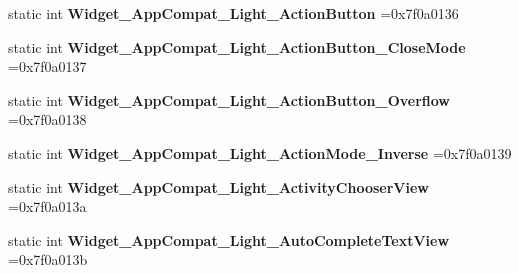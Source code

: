 \begin{DoxyCompactItemize}
\mbox{\label{classandroid_1_1support_1_1graphics_1_1drawable_1_1animated_1_1R_1_1style_a8b557196bb4a954696ad974012ed06b7}} 
static int {\bfseries Widget\+\_\+\+App\+Compat\+\_\+\+Light\+\_\+\+Action\+Button} =0x7f0a0136
\item 
\mbox{\label{classandroid_1_1support_1_1graphics_1_1drawable_1_1animated_1_1R_1_1style_a15cfbbe2348e811a4c38a0bebd78b4c4}} 
static int {\bfseries Widget\+\_\+\+App\+Compat\+\_\+\+Light\+\_\+\+Action\+Button\+\_\+\+Close\+Mode} =0x7f0a0137
\item 
\mbox{\label{classandroid_1_1support_1_1graphics_1_1drawable_1_1animated_1_1R_1_1style_a9a9e6d5be5f38e6988c7c5eeb030dee9}} 
static int {\bfseries Widget\+\_\+\+App\+Compat\+\_\+\+Light\+\_\+\+Action\+Button\+\_\+\+Overflow} =0x7f0a0138
\item 
\mbox{\label{classandroid_1_1support_1_1graphics_1_1drawable_1_1animated_1_1R_1_1style_adfcdf5890798fdfa145b191c2c83d2bc}} 
static int {\bfseries Widget\+\_\+\+App\+Compat\+\_\+\+Light\+\_\+\+Action\+Mode\+\_\+\+Inverse} =0x7f0a0139
\item 
\mbox{\label{classandroid_1_1support_1_1graphics_1_1drawable_1_1animated_1_1R_1_1style_a9a014849a1db3779a7ecacf655417759}} 
static int {\bfseries Widget\+\_\+\+App\+Compat\+\_\+\+Light\+\_\+\+Activity\+Chooser\+View} =0x7f0a013a
\item 
\mbox{\label{classandroid_1_1support_1_1graphics_1_1drawable_1_1animated_1_1R_1_1style_a51f68f93ce3e82b09b2e20dc1dcc174c}} 
static int {\bfseries Widget\+\_\+\+App\+Compat\+\_\+\+Light\+\_\+\+Auto\+Complete\+Text\+View} =0x7f0a013b
\item 
\mbox{\label{classandroid_1_1support_1_1graphics_1_1drawable_1_1animated_1_1R_1_1style_adfb109953d1ae75ac0c9fca5ee10bfc5}} 

\end{DoxyCompactItemize}

